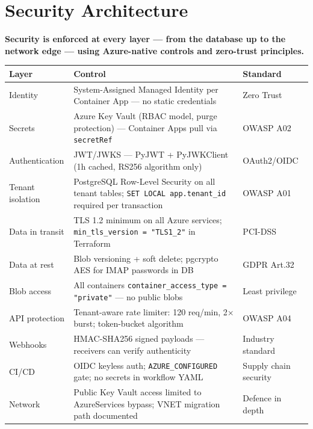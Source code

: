 \documentclass[12pt,a4paper]{article}
\newcommand{\keypoint}[1]{%
  \begin{tcolorbox}[colback=HighlightYellow, colframe=NordicGold,
    boxrule=1.2pt, arc=4pt, left=8pt, right=8pt, top=5pt, bottom=5pt]
    \faExclamationCircle\hspace{6pt}\textbf{#1}
  \end{tcolorbox}
}
\newcommand{\codeinline}[1]{\texttt{\small\color{NordicBlue}#1}}
\begin{document}
\newpage

\section{Security Architecture}

\keypoint{Security is enforced at every layer — from the database up to the network edge — using Azure-native controls and zero-trust principles.}

\begin{tabularx}{\textwidth}{lXl}
\toprule
\textbf{Layer} & \textbf{Control} & \textbf{Standard} \\
\midrule
Identity & System-Assigned Managed Identity per Container App — no static credentials & Zero Trust \\
Secrets & Azure Key Vault (RBAC model, purge protection) — Container Apps pull via \codeinline{secretRef} & OWASP A02 \\
Authentication & JWT/JWKS — PyJWT + PyJWKClient (1h cached, RS256 algorithm only) & OAuth2/OIDC \\
Tenant isolation & PostgreSQL Row-Level Security on all tenant tables; \codeinline{SET LOCAL app.tenant\_id} required per transaction & OWASP A01 \\
Data in transit & TLS 1.2 minimum on all Azure services; \codeinline{min\_tls\_version = "TLS1\_2"} in Terraform & PCI-DSS \\
Data at rest & Blob versioning + soft delete; pgcrypto AES for IMAP passwords in DB & GDPR Art.32 \\
Blob access & All containers \codeinline{container\_access\_type = "private"} — no public blobs & Least privilege \\
API protection & Tenant-aware rate limiter: 120 req/min, 2× burst; token-bucket algorithm & OWASP A04 \\
Webhooks & HMAC-SHA256 signed payloads — receivers can verify authenticity & Industry standard \\
CI/CD & OIDC keyless auth; \codeinline{AZURE\_CONFIGURED} gate; no secrets in workflow YAML & Supply chain security \\
Network & Public Key Vault access limited to AzureServices bypass; VNET migration path documented & Defence in depth \\
\bottomrule
\end{tabularx}

\vspace{0.8em}
\end{document}
